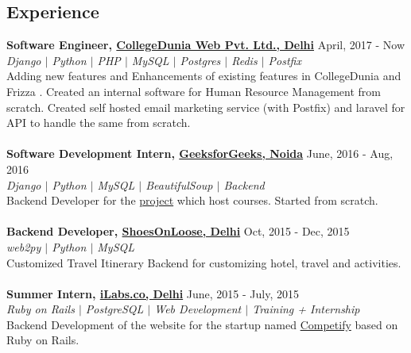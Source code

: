\documentclass[margin, centered]{res}
\begin{document}
\begin{resume}
\section{Experience}
\textbf{Software Engineer, \href{https://collegedunia.com}{CollegeDunia Web Pvt. Ltd., Delhi}} \hfill April, 2017 - Now\\
\emph{\color{BlueViolet}Django $\vert$ Python $\vert$ PHP $\vert$ MySQL $\vert$ Postgres $\vert$ Redis $\vert$ Postfix} \\
Adding new features and Enhancements of existing features in CollegeDunia and Frizza . Created an internal software for Human Resource Management from scratch. Created self hosted email marketing service (with Postfix) and laravel for API to handle the same from scratch.\\
\\
\textbf{Software Development Intern, \href{http://www.geeksforgeeks.org}{GeeksforGeeks, Noida}} \hfill June, 2016 - Aug, 2016\\
\emph{\color{BlueViolet}Django $\vert$ Python $\vert$ MySQL $\vert$ BeautifulSoup $\vert$ Backend}  \\
Backend Developer for the \href{http://courses.geeksforgeeks.org}{project} which host courses. Started from scratch.  \\
\\
\textbf{Backend Developer, \href {http://shoesonloose.com/}{ShoesOnLoose, Delhi}} \hfill Oct, 2015 - Dec, 2015 \\
\emph{\color{BlueViolet}web2py $\vert$ Python $\vert$ MySQL} \\
Customized Travel Itinerary Backend for customizing hotel, travel and activities. \\
\\
\textbf{Summer Intern, \href{http://www.ilabs.co}{iLabs.co, Delhi}} \hfill June, 2015 - July, 2015 \\
\emph{\color{BlueViolet}Ruby on Rails $\vert$ PostgreSQL $\vert$ Web Development $\vert$ Training + Internship} \\
Backend Development of the website for the startup named \href {http://competifyin.herokuapp.com} {Competify} based on Ruby on Rails. 

\end{resume}
\end{document}
